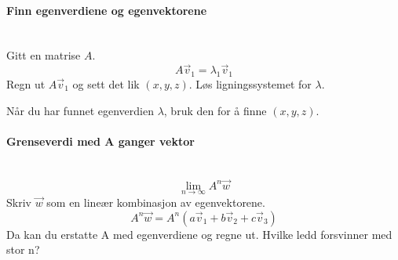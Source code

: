 \paragraph{Finn egenverdiene og egenvektorene} \mbox{} \\
Gitt en matrise $A$.
$$A\vec{v}_1 = \lambda_1 \vec{v}_1$$
Regn ut $A\vec{v}_1$ og sett det lik $(x,y,z)$.
Løs ligningssystemet for $\lambda$.

Når du har funnet egenverdien $\lambda$, bruk den for å finne $(x,y,z)$.



\paragraph{Grenseverdi med A ganger vektor} \mbox{} \\
$$\lim_{n \to \infty} A^n \vec{w}$$
Skriv $\vec{w}$ som en lineær kombinasjon av egenvektorene.
$$A^n \vec{w} = A^n (a\vec{v}_1 + b\vec{v}_2 + c\vec{v}_3)$$
Da kan du erstatte A med egenverdiene og regne ut.
Hvilke ledd forsvinner med stor n?
